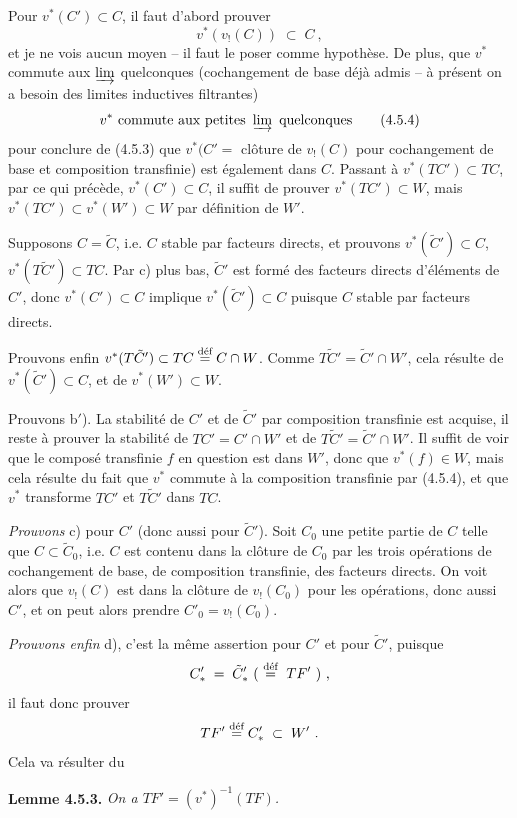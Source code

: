 Pour $v^*(C') \subset C$, il faut d'abord prouver
\[
v^*(v_!(C)) \;\subset\; C\ , \tag*{(4.5.3)}
\]
et je ne vois aucun moyen -- il faut le poser comme hypothèse. De plus, que $v^*$ commute aux $\varinjlim$ quelconques (cochangement de base déjà admis -- à présent on a besoin des limites inductives filtrantes)
\[
v^* \text{ commute aux petites } \varinjlim \text{ quelconques} \tag*{(4.5.4)}
\]
pour conclure de (4.5.3) que $v^*(C' =$ clôture de $v_!(C)$ pour cochangement de base et composition transfinie) est également dans $C$. Passant à $v^*(TC') \subset TC$, par ce qui précède, $v^*(C') \subset C$, il suffit de prouver $v^*(TC') \subset W$, mais $v^*(TC') \subset v^*(W') \subset W$ par définition de $W'$.

Supposons $C = \tilde{C}$, i.e. $C$ stable par facteurs directs, et prouvons $v^*(\tilde{C}') \subset C$, $v^*(T\tilde{C}') \subset TC$. Par c) plus bas, $\tilde{C}'$ est formé des facteurs directs
d'éléments de $C'$, donc $v^*(C') \subset C$ implique $v^*(\tilde{C}') \subset C$ puisque $C$ stable par facteurs directs.

Prouvons enfin $v^*(T\tilde{C}') \subset TC \defeq C \cap W$. Comme $T\tilde{C}' = \tilde{C}' \cap W'$, cela résulte de $v^*(\tilde{C}') \subset C$, et de $v^*(W') \subset W$.

Prouvons b$'$). La stabilité de $C'$ et de $\tilde{C}'$ par composition transfinie est acquise, il reste à prouver la stabilité de $TC' = C' \cap W'$ et de $T\tilde{C}' = \tilde{C}' \cap W'$. Il suffit de voir que le composé transfinie $f$ en question est dans $W'$, donc que $v^*(f) \in W$, mais cela résulte du fait que $v^*$ commute à la composition transfinie par (4.5.4), et que $v^*$ transforme $TC'$ et $T\tilde{C}'$ dans $TC$.

\textit{Prouvons} c) pour $C'$ (donc aussi pour $\tilde{C}'$). Soit $C_0$ une petite partie de $C$ telle que $C \subset \tilde{C}_0$, i.e. $C$ est contenu dans la clôture de $C_0$ par les trois opérations de cochangement de base, de composition transfinie, des facteurs directs. On voit alors que $v_!(C)$ est dans la clôture de $v_!(C_0)$ pour les opérations, donc aussi $C'$, et on peut alors prendre $C'_0 = v_!(C_0)$.

\textit{Prouvons enfin} d), c'est la même assertion pour $C'$ et pour $\tilde{C}'$, puisque
\[
C'_* \;=\; \tilde{C}'_*\ (\ \defeq\ TF'\ )\ ,
\]
il faut donc prouver
\[
TF' \defeq C'_* \;\subset\; W'\ .
\]
Cela va résulter du

\textbf{Lemme 4.5.3.} \textit{On a $TF' = (v^*)^{-1}(TF)$.}

